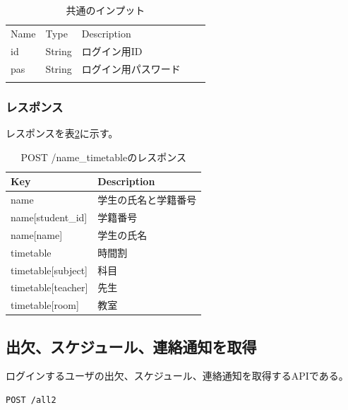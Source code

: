 \documentclass[a4j,12pt,onecolumn,oneside,titlepage,openany,final]{jreport}
\begin{document}
\begin{table}[htbp]
  \caption{共通のインプット}
  \centering
\begin{tabular}{lllll}
\cline{1-3}
\multicolumn{1}{|l|}{Name} & \multicolumn{1}{l|}{Type}   & \multicolumn{1}{l|}{Description} &  &  \\ \cline{1-3}
\multicolumn{1}{|l|}{id}   & \multicolumn{1}{l|}{String} & \multicolumn{1}{l|}{ログイン用ID}     &  &  \\ \cline{1-3}
\multicolumn{1}{|l|}{pas}  & \multicolumn{1}{l|}{String} & \multicolumn{1}{l|}{ログイン用パスワード}  &  &  \\ \cline{1-3}
                           &                             &                                  &  &
\end{tabular}
\label{input}
\end{table}

\subsubsection{レスポンス}
レスポンスを表\ref{timetable}に示す。
\begin{table}[htbp]
\caption{POST /name\_timetableのレスポンス}
\centering
\begin{tabular}{|l|l|}
\hline
Key                    & Description                    \\ \hline
name                   & 学生の氏名と学籍番号 \\ \hline
name{[}student\_id{]}  & 学籍番号                           \\ \hline
name{[}name{]}         & 学生の氏名                          \\ \hline
timetable              & 時間割                            \\ \hline
timetable{[}subject{]} & 科目                             \\ \hline
timetable{[}teacher{]} & 先生                             \\ \hline
timetable{[}room{]}    & 教室                             \\ \hline
\end{tabular}
\label{timetable}
\end{table}
\subsection{出欠、スケジュール、連絡通知を取得}
ログインするユーザの出欠、スケジュール、連絡通知を取得するAPIである。
\begin{lstlisting}[language=http, firstnumber=1]
 POST /all2
\end{lstlisting}
\end{document}
